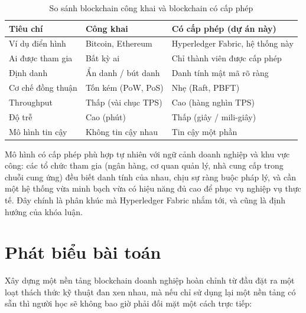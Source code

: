 \begin{table}[H]
\centering
\caption{So sánh blockchain công khai và blockchain có cấp phép}
\label{tab:public-permissioned}
\begin{tabular}{@{}p{3.2cm}p{4.2cm}p{4.2cm}@{}}
\toprule
\textbf{Tiêu chí} & \textbf{Công khai} & \textbf{Có cấp phép (dự án này)} \\
\midrule
Ví dụ điển hình & Bitcoin, Ethereum & Hyperledger Fabric, hệ thống này \\
Ai được tham gia & Bất kỳ ai & Chỉ thành viên được cấp phép \\
Định danh & Ẩn danh / bút danh & Danh tính mật mã rõ ràng \\
Cơ chế đồng thuận & Tốn kém (PoW, PoS) & Nhẹ (Raft, PBFT) \\
Throughput & Thấp (vài chục TPS) & Cao (hàng nghìn TPS) \\
Độ trễ & Cao (phút) & Thấp (giây / mili-giây) \\
Mô hình tin cậy & Không tin cậy nhau & Tin cậy một phần \\
\bottomrule
\end{tabular}
\end{table}

Mô hình có cấp phép phù hợp tự nhiên với ngữ cảnh doanh nghiệp và khu vực công:
các tổ chức tham gia (ngân hàng, cơ quan quản lý, nhà cung cấp trong chuỗi cung
ứng) đều biết danh tính của nhau, chịu sự ràng buộc pháp lý, và cần một hệ thống
vừa minh bạch vừa có hiệu năng đủ cao để phục vụ nghiệp vụ thực tế. Đây chính là
phân khúc mà Hyperledger Fabric nhắm tới, và cũng là định hướng của khóa luận.

\section{Phát biểu bài toán}
\label{sec:problem}

Xây dựng một nền tảng blockchain doanh nghiệp hoàn chỉnh từ đầu đặt ra một loạt
thách thức kỹ thuật đan xen nhau, mà nếu chỉ sử dụng lại một nền tảng có sẵn thì
người học sẽ không bao giờ phải đối mặt một cách trực tiếp:

